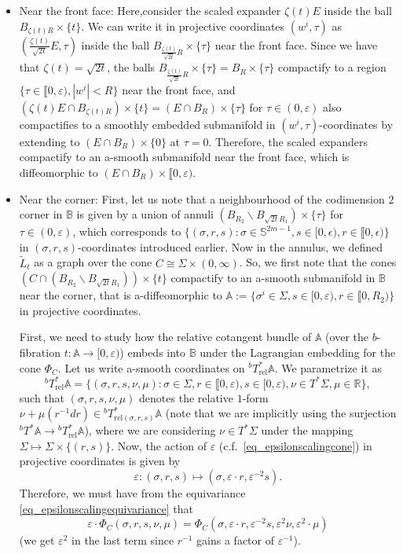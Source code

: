 \documentclass[10pt, a4paper]{article}
\theoremstyle{plain}%
\theoremstyle{definition}
\numberwithin{figure}{section}
\numberwithin{equation}{section}
\newcommand{\bR}{\mathbb{R}}
\newcommand{\bA}{\mathbb{A}}
\newcommand{\bS}{\mathbb{S}}
\newcommand{\bB}{\mathbb{B}}
\newcommand{\rt}{\rightarrow}
\newcommand{\ep}{\varepsilon}
\newcommand{\tL}{\widetilde{L}}
\newcommand{\rel}{\mathrm{rel}}
\begin{document}
\begin{itemize}
	\item 
	Near the front face: Here,consider the scaled expander $\zeta(t)E$ inside the ball $B_{\zeta(t)R}\times\{t\}$. We can write it in projective coordinates $(w^i,\tau)$ as $(\frac{\zeta(t)}{\sqrt{2t}} E, \tau)$ inside the ball $B_{\frac{\zeta(t)}{\sqrt{2t}}R}\times \{\tau\}$ near the front face. 
	Since we have that $\zeta(t)=\sqrt{2t}$, the balls $B_{\frac{\zeta(t)}{\sqrt{2t}}R}\times \{\tau\}=B_{R}\times \{\tau\}$ compactify to a region $\{\tau \in \llbracket0,\ep), |w^i|<R\}$ near the front face, and $(\zeta(t)E\cap B_{\zeta(t)R})\times\{t\} = (E\cap B_{R})\times\{\tau\}$ for $\tau\in(0,\ep)$ also compactifies to a smoothly embedded submanifold in $(w^i,\tau)$-coordinates by extending to $(E\cap B_R) \times \{0\}$ at $\tau=0$. Therefore, the scaled expanders compactify to an a-smooth submanifold near the front face, which is diffeomorphic to $(E\cap B_R) \times \llbracket 0, \ep)$.
	 
    \item Near the corner: 
    First, let us note that a neighbourhood of the codimension $2$ corner in $\bB$ is given by a union of annuli $(B_{R_2}\backslash B_{\sqrt{2t}R_1})\times \{\tau\}$ for $\tau \in (0,\ep)$, which corresponds to $\{(\sigma,r,s):\sigma\in \bS^{2m-1}, s\in [0,\epsilon), r\in \llbracket0,\epsilon)\}$ in $(\sigma,r,s)$-coordinates introduced earlier. Now in the annulus, we defined $\tL_t$ as a graph over the cone $C \cong \Sigma\times(0,\infty)$. So, we first note that the cones $(C\cap (B_{R_2}\backslash B_{\sqrt{2t}R_1})) \times \{t\}$ compactify to an a-smooth submanifold in $\bB$ near the corner, that is a-diffeomorphic to $\mathbb{A} := \{ \sigma^i \in \Sigma, s\in [0,\varepsilon), r \in \llbracket 0,R_2)\}$ in projective coordinates.
    
    First, we need to study how the relative cotangent bundle of $\bA$ (over the $b$-fibration $t:\bA\rt [0,\ep)$) embeds into $\bB$ under the Lagrangian embedding for the cone $\Phi_C$. Let us write a-smooth coordinates on $^bT^*_\mathrm{rel}\bA$. We parametrize it as \[
    ^bT^*_\mathrm{rel}\bA = \{(\sigma,r,s,\nu,\mu): \sigma\in \Sigma, r\in \llbracket0,\ep), s\in [0,\ep), \nu\in T^*\Sigma, \mu \in \bR\},
    \]
    such that $(\sigma,r,s,\nu,\mu)$ denotes the relative $1$-form $\nu + \mu (r^{-1}dr)\in {^b}T^*_{\mathrm{rel}(\sigma,r,s)}\bA$ (note that we are implicitly using the surjection $^bT^*\bA \rt {^bT^*_\rel}\bA$), where we are considering $\nu\in T^*\Sigma$ under the mapping $\Sigma \mapsto \Sigma\times\{(r,s)\}$.
    Now, the action of $\ep$ (c.f.\ \eqref{eq_epsilonscalingcone}) in projective coordinates is given by \[
    \ep: (\sigma,r,s)\mapsto (\sigma,\ep\cdot r, \ep^{-2}s).
    \]
    Therefore, we must have from the equivariance \eqref{eq_epsilonscalingequivariance} that \[
    \ep \cdot \Phi_{C}(\sigma,r,s,\nu,\mu) = \Phi_{C}(\sigma, \ep\cdot r, \ep^{-2}s, \ep^2\nu,\ep^2\cdot \mu)
    \]
    (we get $\ep^2$ in the last term since $r^{-1}$ gains a factor of $\ep^{-1}$).
    

\end{itemize}
\end{document}
